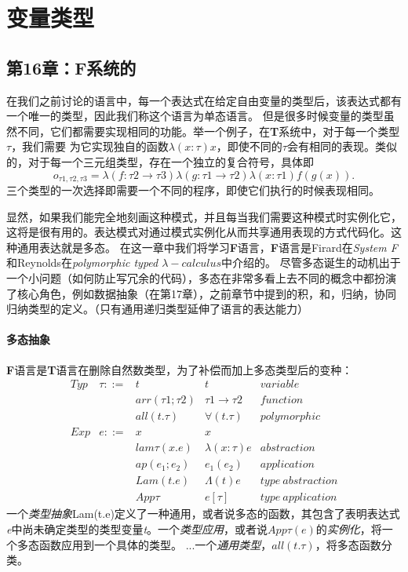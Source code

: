 
\part{变量类型}
\chapter{第16章：F系统的}

在我们之前讨论的语言中，每一个表达式在给定自由变量的类型后，该表达式都有一个唯一的类型，因此我们称这个语言为单态语言。
但是很多时候变量的类型虽然不同，它们都需要实现相同的功能。举一个例子，在\textbf{T}系统中，对于每一个类型$\tau$，我们需要
为它实现独自的函数$\lambda (x:\tau) x$，即使不同的$\tau$会有相同的表现。类似的，对于每一个三元组类型，存在一个独立的复合符号，具体即
$$o_{\tau 1, \tau 2, \tau 3} = \lambda (f:\tau 2 \to \tau 3) \lambda (g: \tau1 \to \tau2) \lambda (x:\tau1) f(g(x)).$$
三个类型的一次选择即需要一个不同的程序，即使它们执行的时候表现相同。

显然，如果我们能完全地刻画这种模式，并且每当我们需要这种模式时实例化它，这将是很有用的。表达模式对通过模式实例化从而共享通用表现的方式代码化。这种通用表达就是多态。
在这一章中我们将学习\textbf{F}语言，\textbf{F}语言是Firard在\textit{System F}和Reynolds在\textit{polymorphic typed $\lambda-calculus$}中介绍的。
尽管多态诞生的动机出于一个小问题（如何防止写冗余的代码），多态在非常多看上去不同的概念中都扮演了核心角色，例如数据抽象（在第17章），之前章节中提到的积，和，归纳，协同归纳类型的定义。（只有通用递归类型延伸了语言的表达能力）

\subsection{多态抽象}
\textbf{F}语言是\textbf{T}语言在删除自然数类型，为了补偿而加上多态类型后的变种：
\begin{align*}
  Typ &\tau ::= &t \qquad                  &t                &variable \\
      &         &arr(\tau 1;\tau 2)  &\tau1 \to \tau2  &function \\
      &         &all(t.\tau)         &\forall(t.\tau)  &polymorphic \\
  Exp &e ::=    &x  \qquad                 &x                &\\
      &         &lam{\tau}(x.e)      &\lambda(x:\tau)e &abstraction   \\
      &         &ap(e_1; e_2)        &e_1(e_2)         &application\\
      &         &Lam(t.e)            &\Lambda(t)e      &type\ abstraction\\
      &         &App{\tau}           &e[\tau]          &type\ application
\end{align*}
一个\textit{类型抽象}Lam(t.e)定义了一种通用，或者说多态的函数，其包含了表明表达式\textit{e}中尚未确定类型的类型变量\textit{t}。一个\textit{类型应用}，或者说$App{\tau}(e)$的\textit{实例化}，将一个多态函数应用到一个具体的类型。
...一个\textit{通用类型}，$all(t.\tau)$，将多态函数分类。

